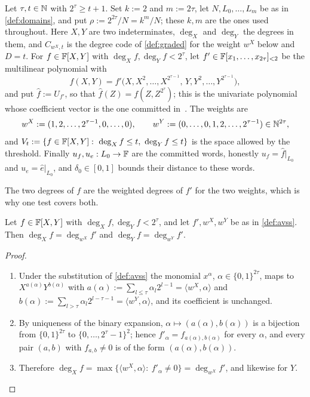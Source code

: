 \begin{definition}\label{def:avss}
Let $\tau,t\in\mathbb{N}$ with $2^\tau\ge t+1$. Set $k:=2$ and $m:=2\tau$, let $N,L_0,\dots,L_m$ be as
in \cref{def:domains}, and put $\rho:=2^{2\tau}/N=k^m/N$; these $k,m$ are the ones used
throughout. Here $X,Y$ are two indeterminates, $\deg_X$ and $\deg_Y$ the degrees in them, and
$C_{w^X,t}$ is the degree code of \cref{def:graded} for the weight $w^X$ below and $D=t$. For
$f\in\mathbb{F}[X,Y]$ with
$\deg_Xf,\deg_Yf<2^\tau$, let $f'\in\mathbb{F}[x_1,\dots,x_{2\tau}]_{<2}$ be the multilinear polynomial
with
\[
f(X,Y)=f'\big(X,X^2,\dots,X^{2^{\tau-1}},\,Y,Y^2,\dots,Y^{2^{\tau-1}}\big),
\]
and put $\hat f:=U_{f'}$, so that $\hat f(Z)=f(Z,Z^{2^\tau})$; this is the univariate polynomial
whose coefficient vector is the one committed in~\cite[\S3.3]{PolyFRIM}. The weights are
\[
w^X:=(1,2,\dots,2^{\tau-1},0,\dots,0),\qquad
w^Y:=(0,\dots,0,1,2,\dots,2^{\tau-1})\in\mathbb{N}^{2\tau},
\]
and $V_t:=\{f\in\mathbb{F}[X,Y]:\ \deg_Xf\le t,\ \deg_Yf\le t\}$ is the space allowed by the threshold.
Finally $u_f,u_e:L_0\to\mathbb{F}$ are the committed words, honestly $u_f=\hat f|_{L_0}$ and
$u_e=\hat e|_{L_0}$, and $\delta_0\in[0,1]$ bounds their distance to these words.
\end{definition}

The two degrees of $f$ are the weighted degrees of $f'$ for the two weights, which is why one
test covers both.

\begin{lemma}\label{lem:avss-bits}
Let $f\in\mathbb{F}[X,Y]$ with $\deg_Xf,\deg_Yf<2^\tau$, and let $f',w^X,w^Y$ be as in
\cref{def:avss}. Then $\deg_Xf=\deg_{w^X}f'$ and $\deg_Yf=\deg_{w^Y}f'$.
\end{lemma}

\begin{proof}
\begin{enumerate}
\item Under the substitution of \cref{def:avss} the monomial $x^\alpha$,
$\alpha\in\{0,1\}^{2\tau}$, maps to $X^{a(\alpha)}Y^{b(\alpha)}$ with
$a(\alpha):=\sum_{l\le\tau}\alpha_l2^{l-1}=\langle w^X,\alpha\rangle$ and
$b(\alpha):=\sum_{l>\tau}\alpha_l2^{l-\tau-1}=\langle w^Y,\alpha\rangle$, and its coefficient
is unchanged.
\item By uniqueness of the binary expansion, $\alpha\mapsto(a(\alpha),b(\alpha))$ is a bijection
from $\{0,1\}^{2\tau}$ to $\{0,\dots,2^\tau-1\}^2$; hence $f'_\alpha=f_{a(\alpha),b(\alpha)}$ for every
$\alpha$, and every pair $(a,b)$ with $f_{a,b}\ne0$ is of the form $(a(\alpha),b(\alpha))$.
\item Therefore $\deg_Xf=\max\{\langle w^X,\alpha\rangle:\ f'_\alpha\ne0\}=\deg_{w^X}f'$, and
likewise for $Y$.
\end{enumerate}
\end{proof}

